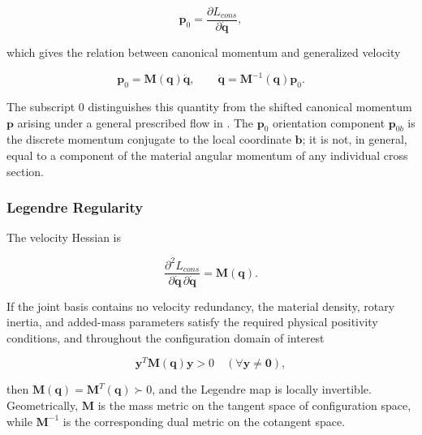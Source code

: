 \begin{equation}
\label{eq:hamiltonian-3-9}
\mathbf{p}_{0} = \frac{\partial L_{cons}}{\partial\dot{\mathbf{q}}},
\end{equation}

which gives the relation between canonical momentum and generalized velocity

\begin{equation}
\label{eq:hamiltonian-3-10}
\boxed{\mathbf{p}_{0} = \mathbf{M}\left( \mathbf{q} \right)\dot{\mathbf{q}},\quad\quad\dot{\mathbf{q}} = \mathbf{M}^{- 1}\left( \mathbf{q} \right)\mathbf{p}_{0}.}
\end{equation}

The subscript \(0\) distinguishes this quantity from the shifted canonical momentum \(\mathbf{p}\) arising under a general prescribed flow in . The \(\mathbf{p}_{0}\) orientation component \(\mathbf{p}_{0b}\) is the discrete momentum conjugate to the local coordinate \(\mathbf{b}\); it is not, in general, equal to a component of the material angular momentum of any individual cross section.

\subsubsection{Legendre Regularity}\label{sec:hamiltonian-3-2-3}

The velocity Hessian is\cite{MarsdenRatiu1999MechanicsSymmetry,Arnold1989ClassicalMechanics}

\begin{equation}
\label{eq:hamiltonian-3-11}
\frac{\partial^{2}L_{cons}}{\partial\dot{\mathbf{q}}\,\partial\dot{\mathbf{q}}} = \mathbf{M}\left( \mathbf{q} \right).
\end{equation}

If the joint basis contains no velocity redundancy, the material density, rotary inertia, and added-mass parameters satisfy the required physical positivity conditions, and throughout the configuration domain of interest

\begin{equation}
\label{eq:hamiltonian-3-12}
\boxed{\mathbf{y}^{T}\mathbf{M}\left( \mathbf{q} \right)\mathbf{y} > 0\quad\left( \forall\mathbf{y} \neq \mathbf{0} \right),}
\end{equation}

then \(\mathbf{M}\left( \mathbf{q} \right) = \mathbf{M}^{T}\left( \mathbf{q} \right) \succ 0\), and the Legendre map is locally invertible. Geometrically, \(\mathbf{M}\) is the mass metric on the tangent space of configuration space, while \(\mathbf{M}^{-1}\) is the corresponding dual metric on the cotangent space.

